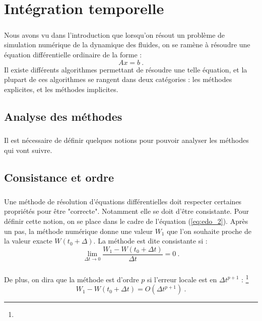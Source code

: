 \chapter{Intégration temporelle}

\paragraph{}
Nous avons vu dans l'introduction que lorsqu'on résout un problème de simulation numérique de la dynamique des fluides, on se ramène à résoudre une équation différentielle ordinaire de la forme :
\begin{equation}\label{eq:edo_2}
  Ax = b\ .
\end{equation}
Il existe différents algorithmes permettant de résoudre une telle équation, et la plupart de ces algorithmes se rangent dans deux catégories : les méthodes explicites, et les méthodes implicites.

\section{Analyse des méthodes}

  \paragraph{}
  Il est nécessaire de définir quelques notions pour pouvoir analyser les méthodes qui vont suivre.

  \section{Consistance et ordre}

    \paragraph{}
    Une méthode de résolution d'équations différentielles doit respecter certaines propriétés pour être "correcte".
    Notamment elle se doit d'être consistante.
    Pour définir cette notion, on se place dans le cadre de l'équation (\ref{eq:edo_2}).
    Après un pas, la méthode numérique donne une valeur $W_1$ que l'on souhaite proche de la valeur exacte $W\left(t_0 + \Delta\right)$.
    La méthode est dite consistante si :
    \[\lim_{\Delta t \rightarrow 0} \frac{W_1 - W\left(t_0 + \Delta t\right)}{\Delta t} = 0\ .\]

    \paragraph{}
    De plus, on dira que la méthode est d'ordre $p$ si l'erreur locale est en $\Delta t^{p+1}$ \cite{HairerNorsettWanner1993} :
    \footnote{}
    \[W_1 - W\left(t_0 + \Delta t\right) = O\left(\Delta t^{p+1}\right)\ .\]


